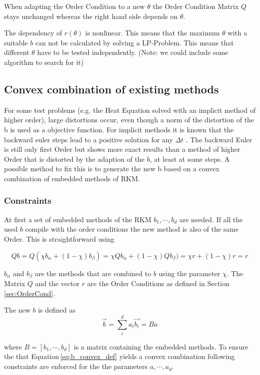 \documentclass{article}
\begin{document}
When adapting the Order Condition to a new $\theta$ the Order Condition Matrix $Q$ stays unchanged whereas the right hand side depends on $\theta$.

The dependency of $r(\theta)$ is nonlinear. This means that the maximum $\theta$ with a suitable $b$ can not be calculated by solving a LP-Problem. This means that different $\theta$ have to be tested independently. 
(Note: we could include some algorithm to search for it)


\subsection{Convex combination of existing methods}\label{sec:convex}
For some test problems (e.g. the Heat Equation solved with an implicit method of higher order), large distortions occur, even though a norm of the distortion of the b is used as a objective function. 
For implicit methods it is known that the backward euler steps lead to a positive solution for any $\Delta t$ \cite{hundsdorfer_numerical_2003}. The backward Euler is still only first Order but shows more exact results than a method of higher Order that is distorted by the adaption of the $b$, at least at some steps. 
A possible method to fix this is to generate the new b based on a convex combination of embedded methods of RKM. 

\subsubsection{Constraints}
At first a set of embedded methods of the RKM $b_1,\cdots,b_d$ are needed. 
If all the used $b$ compile with the order conditions the new method is also of the same Order.
This is straightforward using

$$ Q b = Q (\chi b_{\alpha} + (1-\chi) b_{\beta}) = \chi Q  b_{\alpha} + (1-\chi) Q b_{\beta}) = \chi r + (1-\chi) r = r$$

$b_{\alpha}$ and $b_{\beta}$ are the methods that are combined to $b$ using the parameter $\chi$. The Matrix $Q$ and the vector $r$ are the Order Conditions as defined in Section\,\ref{sec:OrderCond}.

The new $b$ is defined as 
\begin{equation}\label{eq:b_convex_def}
\vec{b} = \sum_i^d a_i \vec{b_i} = Ba
\end{equation}


where $B=\left[b_1,\cdots,b_d \right]$ is a matrix containing the embedded methods.  
To ensure the that Equation\,\ref{eq:b_convex_def} yields a convex combination following constraints are enforced for the  the parameters $a,\cdots,a_d$.
\end{document}
